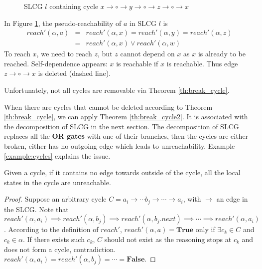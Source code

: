 \begin{example}
    \begin{figure}[ht]
        \centering
        
        \caption[SLCG with cycles]{SLCG $l$ containing cycle $x\to \circ \to y \to \circ \to z\to \circ \to x$}
        \label{cycle1}
    \end{figure}
    
    In Figure \ref{cycle1}, the pseudo-reachability of $a$ in SLCG $l$ is 
    \begin{eqnarray*}
       reach'(\alpha,a)&=&reach'(\alpha,x)=reach'(\alpha,y)=reach'(\alpha,z)    \\
         &=&reach'(\alpha,x)\lor reach'(\alpha,w)
    \end{eqnarray*}
    To reach $x$, we need to reach $z$, but $z$ cannot depend on $x$ as $x$ is already to be reached. 
    Self-dependence appears: $x$ is reachable if $x$ is reachable.
    Thus edge $z\to \circ \to x$ is deleted (dashed line).
\end{example}
Unfortunately, not all cycles are removable via Theorem \ref{th:break_cycle}.

When there are cycles that cannot be deleted according to Theorem \ref{th:break_cycle}, we can apply Theorem \ref{th:break_cycle2}.
It is associated with the decomposition of SLCG in the next section.
The decomposition of SLCG replaces all the \textbf{OR gates} with one of their branches, then the cycles are either broken, either has no outgoing edge which leads to unreachability.
Example \ref{example:cycles} explains the issue.

\begin{theorem}\label{th:break_cycle2}
Given a cycle, if it contains no edge towards outside of the cycle, all the local states in the cycle are unreachable.
\end{theorem}

\begin{proof}
Suppose an arbitrary cycle $C=a_i\to \cdots b_j\to\cdots \to a_i$, with $\to$ an edge in the SLCG.
Note that $reach'(\alpha,a_i)\implies reach'(\alpha,b_j)\implies reach'(\alpha,b_j.next)\implies \cdots\implies reach'(\alpha,a_i)$.
According to the definition of $reach'$, $reach'(\alpha,a)=\mathbf{True}$ only if $\exists c_k\in C$ and $c_k\in \alpha$.
If there exists such $c_k$, $C$ should not exist as the reasoning stops at $c_k$ and does not form a cycle, contradiction.
$reach'(\alpha,a_i)=reach'(\alpha,b_j)=\cdots =\mathbf{False}$.
\end{proof}

